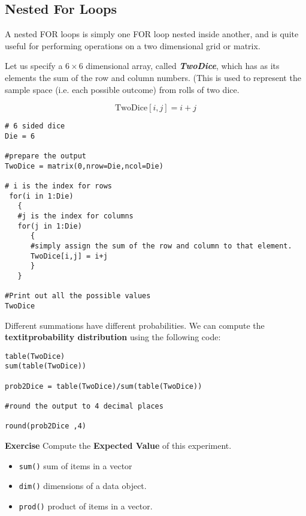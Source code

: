 \newpage 

\subsection{Nested For Loops}

A nested FOR loops is simply one FOR loop nested inside another, and is quite useful for performing operations on a two dimensional grid or matrix.

Let us specify a $6 \times 6$ dimensional array, called \textbf{\textit{TwoDice}}, which has as its elements the sum of the row and column numbers. (This is used to represent the sample space (i.e. each possible outcome) from rolls of two dice.

\[  \mbox{TwoDice}[i,j] = i+j \]


\begin{framed}
\begin{verbatim}
# 6 sided dice
Die = 6

#prepare the output
TwoDice = matrix(0,nrow=Die,ncol=Die)

# i is the index for rows
 for(i in 1:Die)
   {
   #j is the index for columns
   for(j in 1:Die)
      {
      #simply assign the sum of the row and column to that element.
      TwoDice[i,j] = i+j
      }
   }

#Print out all the possible values
TwoDice
\end{verbatim}
\end{framed}

Different summations have different probabilities. We can compute the \textbf{textit{probability distribution}} using the following code:




\begin{framed}
\begin{verbatim}
table(TwoDice)
sum(table(TwoDice))

prob2Dice = table(TwoDice)/sum(table(TwoDice))

#round the output to 4 decimal places

round(prob2Dice ,4)
\end{verbatim}
\end{framed}

\textbf{Exercise} Compute the \textbf{Expected Value} of this experiment.

\begin{itemize}
\item \texttt{sum()} sum of items in a vector
\item \texttt{dim()} dimensions of a data object.
\item \texttt{prod()} product of items in a vector.
\end{itemize}



